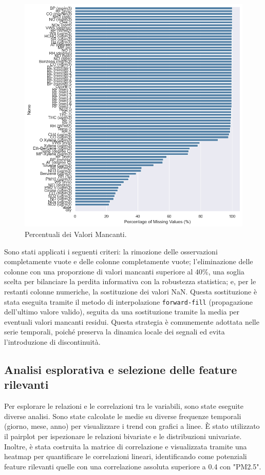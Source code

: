 \documentclass[a4paper,12pt]{report}
\begin{document}
	\begin{figure}[H]
		\centering
		\includegraphics[width=1.0\textwidth]{img/miss_value_pm.png}
		\caption{Percentuali dei Valori Mancanti.}
	\end{figure}
	
	Sono stati applicati i seguenti criteri: la rimozione delle osservazioni completamente vuote e delle colonne completamente vuote; l'eliminazione delle colonne con una proporzione di valori mancanti superiore al 40\%, una soglia scelta per bilanciare la perdita informativa con la robustezza statistica; e, per le restanti colonne numeriche, la sostituzione dei valori NaN. Questa sostituzione è stata eseguita tramite il metodo di interpolazione \texttt{forward-fill} (propagazione dell'ultimo valore valido), seguita da una sostituzione tramite la media per eventuali valori mancanti residui. Questa strategia è comunemente adottata nelle serie temporali, poiché preserva la dinamica locale dei segnali ed evita l'introduzione di discontinuità.
	
	\subsection{Analisi esplorativa e selezione delle feature rilevanti}
	Per esplorare le relazioni e le correlazioni tra le variabili, sono state eseguite diverse analisi. Sono state calcolate le medie su diverse frequenze temporali (giorno, mese, anno) per visualizzare i trend con grafici a linee. È stato utilizzato il pairplot per ispezionare le relazioni bivariate e le distribuzioni univariate. Inoltre, è stata costruita la matrice di correlazione e visualizzata tramite una heatmap per quantificare le correlazioni lineari, identificando come potenziali feature rilevanti quelle con una correlazione assoluta superiore a 0.4 con "PM2.5".
	
\end{document}
